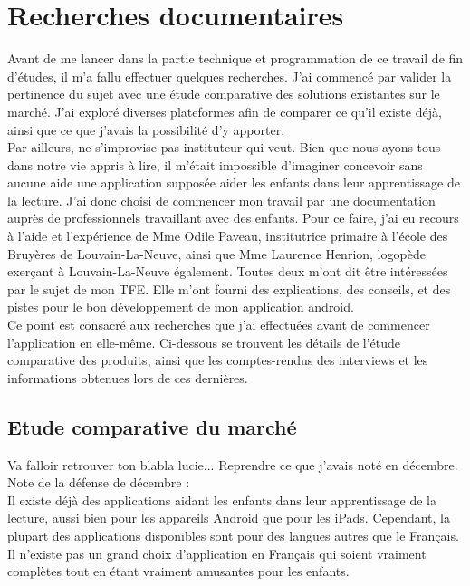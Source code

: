 \section{Recherches documentaires}
Avant de me lancer dans la partie technique et programmation de ce travail de fin d'études, il m'a fallu effectuer quelques recherches. J'ai commencé par valider la pertinence du sujet avec une étude comparative des solutions existantes sur le marché. J'ai exploré diverses plateformes afin de comparer ce qu'il existe déjà, ainsi que ce que j'avais la possibilité d'y apporter. \\

Par ailleurs, ne s'improvise pas instituteur qui veut. Bien que nous ayons tous dans notre vie appris à lire, il m'était impossible d'imaginer concevoir sans aucune aide une application supposée aider les enfants dans leur apprentissage de la lecture. J'ai donc choisi de commencer mon travail par une documentation auprès de professionnels travaillant avec des enfants. Pour ce faire, j'ai eu recours à l'aide et l'expérience de Mme Odile Paveau, institutrice primaire à l'école des Bruyères de Louvain-La-Neuve, ainsi que Mme Laurence Henrion, logopède exerçant à Louvain-La-Neuve également. Toutes deux m'ont dit être intéressées par le sujet de mon TFE. Elle m'ont fourni des explications, des conseils, et des pistes pour le bon développement de mon application android.\\

Ce point est consacré aux recherches que j'ai effectuées avant de commencer l'application en elle-même. Ci-dessous se trouvent les détails de l'étude comparative des produits, ainsi que les comptes-rendus des interviews et les informations obtenues lors de ces dernières.

\subsection{Etude comparative du marché}
Va falloir retrouver ton blabla lucie... Reprendre ce que j'avais noté en décembre. Note de la défense de décembre :\\

Il existe déjà des applications aidant les enfants dans leur apprentissage de la lecture, aussi bien pour les appareils Android que pour les iPads. Cependant, la plupart des applications disponibles sont pour des langues autres que le Français. Il n'existe pas un grand choix d'application en Français qui soient vraiment complètes tout en étant vraiment amusantes pour les enfants.\\

